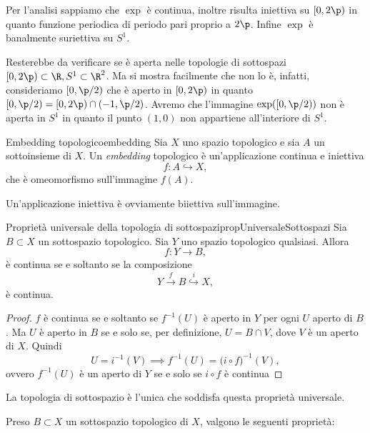 \begin{sol}
	Per l'analisi sappiamo che \(\exp\) è continua, inoltre risulta iniettiva su \([0,2\p)\) in quanto funzione periodica di periodo pari proprio a \(2\p\).
	Infine \(\exp\) è banalmente suriettiva su \(S^1\).

	Resterebbe da verificare se è aperta nelle topologie di sottospazi \([0,2\p)\subset\R,S^1\subset\R^2\).
	Ma si mostra facilmente che non lo è, infatti, consideriamo \([0,\p/2)\) che è aperto in \([0,2\p)\) in quanto \([0,\p/2)=[0,2\p)\cap(-1,\p/2)\).
	Avremo che l'immagine \(\exp([0,\p/2))\) non è aperta in \(S^1\) in quanto il punto \((1,0)\) non appartiene all'interiore di \(S^1\).
\end{sol}

\begin{defn}{Embedding topologico}{embedding}
	Sia \(X\) uno spazio topologico e sia \(A\) un sottoinsieme di \(X\).
	Un \emph{embedding} topologico è un'applicazione continua e iniettiva
	\[
		f\colon A\hookrightarrow X,
	\]
	che è omeomorfismo sull'immagine \(f(A)\).
\end{defn}

\begin{oss}
	Un'applicazione iniettiva è ovviamente biiettiva sull'immagine.
\end{oss}

\begin{teor}{Proprietà universale della topologia di sottospazi}{propUniversaleSottospazi}
	Sia \(B\subset X\) un sottospazio topologico.
	Sia \(Y\) uno spazio topologico qualsiasi.
	Allora
	\[
		f\colon Y\to B,
	\]
	è continua se e soltanto se la composizione
	\[
		Y\overset{f}{\to}B\overset{i}{\hookrightarrow}X,
	\]
	è continua.
\end{teor}

\begin{proof}
	\(f\) è continua se e soltanto se \(f^{-1}(U)\) è aperto in \(Y\) per ogni \(U\) aperto di \(B\).
	Ma \(U\) è aperto in \(B\) se e solo se, per definizione, \(U=B\cap V\), dove \(V\) è un aperto di \(X\).
	Quindi
	\[
		U=i^{-1}(V)\implies f^{-1}(U)=\big(i\circ f\big)^{-1}(V),
	\]
	ovvero \(f^{-1}(U)\) è un aperto di \(Y\) se e solo se \(i\circ f\) è continua
\end{proof}

\begin{oss}
	La topologia di sottospazio è l'unica che soddisfa questa proprietà universale.%
\end{oss}
%
%
Preso \(B\subset X\) un sottospazio topologico di \(X\), valgono le seguenti proprietà:

